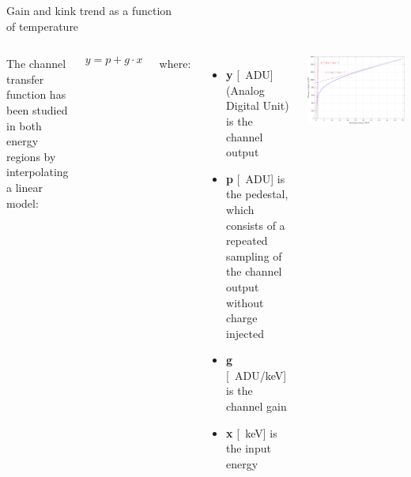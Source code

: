 \documentclass[aspectratio=169,xcolor=dvipsnames]{beamer}
\begin{document}
\begin{frame}{Gain and kink trend as a function\\ \vskip-0.15cm of temperature}
\fontsize{8.5pt}{1}\selectfont
    \begin{columns}
        \addtolength{\leftmargini}{\labelsep}

        \vspace{0.1cm}
        The channel transfer function has been studied in both energy regions by interpolating a linear model:
        \vskip0.2cm
        
        \begin{equation*}
            y = p + g \cdot x
        \end{equation*}

        \vspace{-0.1cm}
        where:
        
        \begin{itemize}
            \itemsep0em
            \item \textbf{y} [\SI{}{ADU}] (Analog Digital Unit) is the channel output
            \item \textbf{p} [\SI{}{ADU}] is the pedestal, which consists of a repeated sampling of the channel output without charge injected
            \item \textbf{g} [\SI{}{ADU/\kilo\electronvolt}] is the channel gain
            \item \textbf{x} [\SI{}{\kilo\electronvolt}] is the input energy
        \end{itemize}

        \vspace{-0.3cm}
        \begin{center}
            \includegraphics[height=0.39\textheight]{images/temperature_effects/fdt_calcolo_kink.pdf}
        \end{center}
        \vspace{0.05cm}


\end{columns}
\end{frame}
\end{document}
